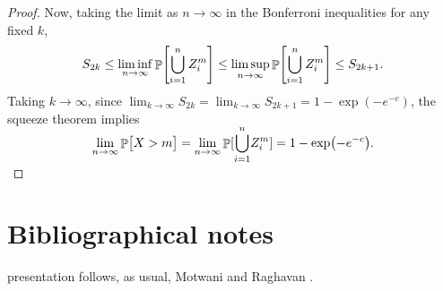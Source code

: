 \begin{proof}
    Now, taking the limit as $n \to \infty$ in the Bonferroni inequalities for any fixed $k$,
    \begin{equation*}
        S_{2k} \leq \liminf_{n \to \infty} \Prob{\bigcup_{i=1}^n Z_i^m}
        \leq \limsup_{n \to \infty} \Prob{\bigcup_{i=1}^n Z_i^m} \leq S_{2k+1}.
    \end{equation*}
    Taking $k \to \infty$, since $\lim_{k \to \infty} S_{2k} = \lim_{k \to \infty} S_{2k+1} = 1 - \exp(-e^{-c})$,
    the squeeze theorem implies
    \begin{equation*}
        \lim_{n \rightarrow \infty} \Prob{\bigl. X > m}%
        =%
        \lim_{n \rightarrow \infty} \Prob{\smash{\bigcup_{i=1}^{n}} Z_i^m}%
        =%
        1 - \exp \pth{ -e^{-c}}.
    \end{equation*}
\end{proof}



\section{Bibliographical notes}

 presentation follows, as usual, Motwani and Raghavan
\cite{mr-ra-95}.







\ChapterEnd{}
